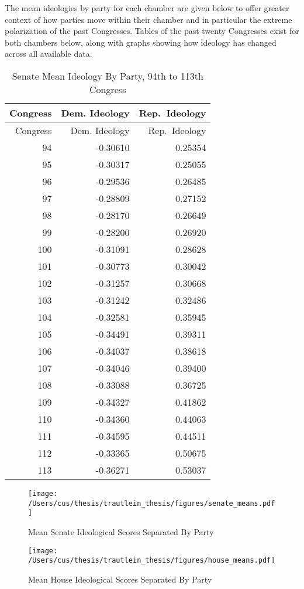 \documentclass[12pt,twoside]{reedthesis}
\begin{document}
  The mean ideologies by party for each chamber are given below to offer
  greater context of how parties move within their chamber and in
  particular the extreme polarization of the past Congresses. Tables of
  the past twenty Congresses exist for both chambers below, along with
  graphs showing how ideology has changed across all available data.
  
  \newpage
  
  \begin{longtable}[c]{@{}rrr@{}}
  \caption{Senate Mean Ideology By Party, 94th to 113th
  Congress}\tabularnewline
  \toprule
  Congress & Dem. Ideology & Rep.~Ideology\tabularnewline
  \midrule
  \endfirsthead
  \toprule
  Congress & Dem. Ideology & Rep.~Ideology\tabularnewline
  \midrule
  \endhead
  94 & -0.30610 & 0.25354\tabularnewline
  95 & -0.30317 & 0.25055\tabularnewline
  96 & -0.29536 & 0.26485\tabularnewline
  97 & -0.28809 & 0.27152\tabularnewline
  98 & -0.28170 & 0.26649\tabularnewline
  99 & -0.28200 & 0.26920\tabularnewline
  100 & -0.31091 & 0.28628\tabularnewline
  101 & -0.30773 & 0.30042\tabularnewline
  102 & -0.31257 & 0.30668\tabularnewline
  103 & -0.31242 & 0.32486\tabularnewline
  104 & -0.32581 & 0.35945\tabularnewline
  105 & -0.34491 & 0.39311\tabularnewline
  106 & -0.34037 & 0.38618\tabularnewline
  107 & -0.34046 & 0.39400\tabularnewline
  108 & -0.33088 & 0.36725\tabularnewline
  109 & -0.34327 & 0.41862\tabularnewline
  110 & -0.34360 & 0.44063\tabularnewline
  111 & -0.34595 & 0.44511\tabularnewline
  112 & -0.33365 & 0.50675\tabularnewline
  113 & -0.36271 & 0.53037\tabularnewline
  \bottomrule
  \end{longtable}
  
  \begin{figure}[h!tbp]
  \centering
  \texttt{[image: /Users/cus/thesis/trautlein\_thesis/figures/senate\_means.pdf]}
  \caption[Mean Senate Ideological Scores Separated By Party]{\normalsize{Mean Senate Ideological Scores Separated By Party}}
  \label{fig:def}
  \end{figure}
  
  \begin{figure}[h!tbp]
  \centering
  \texttt{[image: /Users/cus/thesis/trautlein\_thesis/figures/house\_means.pdf]}
  \caption[Mean House Ideological Scores Separated By Party]{\normalsize{Mean House Ideological Scores Separated By Party}}
  \label{fig:def}
  \end{figure}
  
\end{document}
